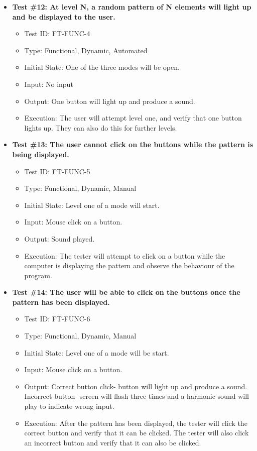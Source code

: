 \documentclass[12pt, titlepage]{article}
\begin{document}
\begin{itemize}
\item \textbf{Test \#12: At level N, a random pattern of N elements will light up and be displayed to the user. }
\begin{itemize}
\item Test ID: FT-FUNC-4
\item Type: Functional, Dynamic, Automated		
\item Initial State: One of the three modes will be open. 					
\item Input: No input				
\item Output: One button will light up and produce a sound.		
\item Execution: The user will attempt level one, and verify that one button lights up. They can also do this for further levels. 
\end{itemize}

\item \textbf{Test \#13: The user cannot click on the buttons while the pattern is being displayed.}
\begin{itemize}
\item Test ID: FT-FUNC-5
\item Type: Functional, Dynamic, Manual	
\item Initial State: Level one of a mode will start.					
\item Input: Mouse click on a button. 					
\item Output: Sound played. 					
\item Execution: The tester will attempt to click on a button while the computer is displaying the pattern and observe the behaviour of the program.
\end{itemize}

\item \textbf{Test \#14: The user will be able to click on the buttons once the pattern has been displayed.}
\begin{itemize}
\item Test ID: FT-FUNC-6
\item Type: Functional, Dynamic, Manual	
\item Initial State: Level one of a mode will be start.					
\item Input: Mouse click on a button.					
\item Output: Correct button click- button will light up and produce a sound. Incorrect button- screen will flash three times and a harmonic sound will play to indicate wrong input. 					
\item Execution: After the pattern has been displayed, the tester will click the correct button and verify that it can be clicked. The tester will also click an incorrect button and verify that it can also be clicked.
\end{itemize}


\end{itemize}
\end{document}
